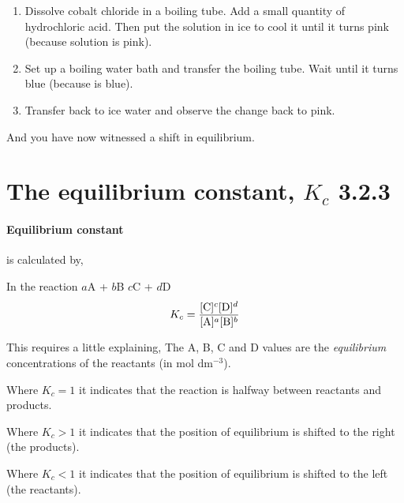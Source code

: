 	\begin{enumerate}
		\item Dissolve cobalt chloride in a boiling tube. Add a small quantity of hydrochloric acid. Then put the solution in ice to cool it until it turns pink (because  solution is pink).
		\item Set up a boiling water bath and transfer the boiling tube. Wait until it turns blue (because  is blue).
		\item Transfer back to ice water and observe the change back to pink.
	\end{enumerate}
	And you have now witnessed a shift in equilibrium.
	
\section{The equilibrium constant, $K_c$ 3.2.3}

	\paragraph{Equilibrium constant} is calculated by,
	\begin{center}
		In the reaction $a$A + $b$B \ch{<=>} $c$C + $d$D
		\begin{equation}
			K_c = \frac{[\textnormal{C}]^c[\textnormal{D}]^d}{[\textnormal{A}]^a[\textnormal{B}]^b}
		\end{equation}
	\end{center}
	This requires a little explaining, The A, B, C and D values are the \textit{equilibrium} concentrations of the reactants (in mol dm$^{-3}$).
	
	Where $K_c = 1$ it indicates that the reaction is halfway between reactants and products.
	
	Where $K_c > 1$ it indicates that the position of equilibrium is shifted to the right (the products).
	
	Where $K_c < 1$ it indicates that the position of equilibrium is shifted to the left (the reactants).
	